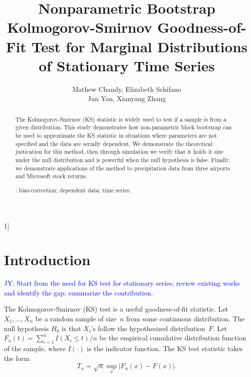 \documentclass[12pt, titlepage, letterpaper]{article}
\newcommand{\jy}[1]{\textcolor{blue}{JY: #1}}
\newcommand{\blind}{1]}
\begin{document}

\title{\bf Nonparametric Bootstrap Kolmogorov-Smirnov Goodness-of-Fit Test for
  Marginal Distributions of Stationary Time Series}
\blind
{
  \author{Mathew Chandy, %
  Elizabeth Schifano\\
  Jun Yan, %
  Xianyang Zhang\\
} \fi


\maketitle


\begin{abstract}

The Kolmogorov-Smirnov (KS) statistic is widely used to test if a sample is
from a given distribution. This study demonstrates how non-parametric 
block bootstrap can be 
used to approximate the KS statistic in situations where parameters are 
not specified and the data are serially dependent. We demonstrate the 
theoretical justication for this method, then through simulation we verify that
it holds it size under the null distribution and is powerful when the null 
hypothesis is false. Finally, we demonstrate applications of the method to
precipitation data from three airports and Microsoft stock returns.

\bigskip
{}:
bias-correction; 
dependent data; 
time series. 
\end{abstract}

\doublespace 


\section{Introduction}
\label{sec:intro}

\jy{Start from the need for KS test for stationary series; review existing works
  and identify the gap; summarize the contribution.}

The Kolmogorov-Smirnov (KS) test is a useful goodness-of-fit statistic. 
Let $X_1, ..., X_n$ be a random sample of size~$n$ from some continuous
distribution. The null hypothesis $H_0$ is that $X_i$'s follow the
hypothesized distribution~$F$.
Let $F_n(t) = \sum_{i=1}^n I(X_i \le t) / n$ be the empirical cumulative
distribution function of the sample, where $I(\cdot)$ is the indicator
function. The KS test statistic takes the form
\begin{equation}
  \label{eq:ks_standard}
  T_n = \sqrt{n} \sup_x | F_{n}(x) - F(x) |.
\end{equation}


}
\end{document}

